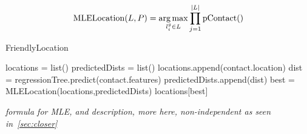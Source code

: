 \[
    \operatorname{MLELocation}(L,P) = \operatorname*{arg\,max}_{l^g_i \in L}
    \prod_{j=1}^{|L|} \operatorname{pContact}()
\]

\begin{algorithm}
  \caption{FriendlyLocation \label{alg:friendloc}}
  \begin{algorithmic}[0]
  \State locations = list()
  \State predictedDists = list()
        \State \Continue
      \EndIf
      \State locations.append(contact.location)
      \State dist = regressionTree.predict(contact.features)
      \State predictedDists.append(dist)
  \EndFor
  \State best = MLELocation(locations,predictedDists)
  \State \Return locations[best]
  \end{algorithmic}
\end{algorithm}

\emph{formula for MLE, and description,
more here,
non-independent as seen in~\ref{sec:closer}
}

